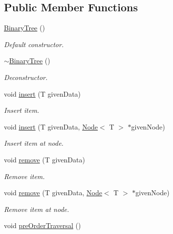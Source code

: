\subsection*{Public Member Functions}
\begin{DoxyCompactItemize}
\item 
\hyperlink{classbinaryTree_1_1BinaryTree_a0605077da9009bf1c5ce15ccdd86d4d7}{Binary\-Tree} ()
\begin{DoxyCompactList}\small\item\em Default constructor. \end{DoxyCompactList}\item 
\hyperlink{classbinaryTree_1_1BinaryTree_a4d0e855e44b6e456659d627c34e4dc8a}{$\sim$\-Binary\-Tree} ()
\begin{DoxyCompactList}\small\item\em Deconstructor. \end{DoxyCompactList}\item 
void \hyperlink{classbinaryTree_1_1BinaryTree_a0a316ce96471e890d341b792bd35818a}{insert} (T given\-Data)
\begin{DoxyCompactList}\small\item\em Insert item. \end{DoxyCompactList}\item 
void \hyperlink{classbinaryTree_1_1BinaryTree_a1c1ae9d052062a790425537d6a10b0b8}{insert} (T given\-Data, \hyperlink{structbinaryTree_1_1Node}{Node}$<$ T $>$ $\ast$given\-Node)
\begin{DoxyCompactList}\small\item\em Insert item at node. \end{DoxyCompactList}\item 
void \hyperlink{classbinaryTree_1_1BinaryTree_aab6c8ba38982c02ec902b24b76d4d167}{remove} (T given\-Data)
\begin{DoxyCompactList}\small\item\em Remove item. \end{DoxyCompactList}\item 
void \hyperlink{classbinaryTree_1_1BinaryTree_a7284bf49d7fe7b3c1e4a3541f38cd9b1}{remove} (T given\-Data, \hyperlink{structbinaryTree_1_1Node}{Node}$<$ T $>$ $\ast$given\-Node)
\begin{DoxyCompactList}\small\item\em Remove item at node. \end{DoxyCompactList}\item 
void \hyperlink{classbinaryTree_1_1BinaryTree_ad26019df7707ec33825e165e3e592fd3}{pre\-Order\-Traversal} ()

\end{DoxyCompactItemize}
